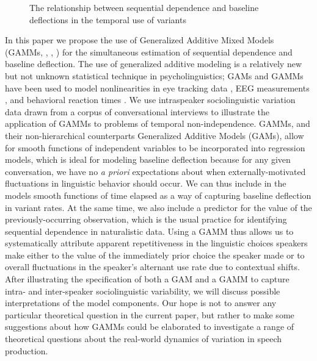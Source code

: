 \documentclass[12pt]{article}
\begin{document}
\begin{figure}
\begin{center}
    \end{center}
\caption{The relationship between sequential dependence and baseline deflections in the temporal use of variants}
\label{confounding}
\end{figure}



 
 In this paper we propose the use of Generalized Additive Mixed Models (GAMMs,  \citealt{hastie1990generalized}, \citealt{zhang1999}, \citealt{ruppert2003}) 
 for the simultaneous estimation of sequential dependence and baseline deflection. 
The use of generalized additive modeling is a relatively new but not unknown statistical technique in psycholinguistics; GAMs and GAMMs have been used to model nonlinearities in eye tracking data \citep{Nixon:2016}, EEG measurements \citep{Tremblay:2014,DeCat:2015}, 
and behavioral reaction times \citep{Pham:2013,Feldman:2015}.
We use intraspeaker sociolinguistic variation data drawn from a corpus of conversational interviews to illustrate the application of GAMMs to problems of temporal non-independence. 
 GAMMs, and their non-hierarchical counterparts Generalized Additive Models (GAMs), allow for smooth functions of independent variables to be incorporated into regression models, which is ideal for modeling baseline deflection because for any given conversation, we have no \textit{a priori} expectations about when externally-motivated fluctuations in linguistic behavior should occur. We can thus include in the models smooth functions of time elapsed as a way of capturing baseline deflection in variant rates.  At the same time, we also include a predictor for the value of the previously-occurring observation, which is the usual practice for identifying sequential dependence in naturalistic data. 
Using a GAMM thus allows us to systematically attribute apparent repetitiveness in the linguistic choices speakers make either to the value of the immediately prior choice the speaker made or to overall fluctuations in the speaker's alternant use rate due to contextual shifts. 
After illustrating the specification of both a GAM and a GAMM to capture intra- and inter-speaker sociolinguistic variability, we will discuss possible interpretations of the model components. Our hope is not to answer any particular theoretical question in the current paper, but rather to make some suggestions about how GAMMs could be elaborated to investigate a range of theoretical questions about the real-world dynamics of variation in speech production. 
\end{document}
